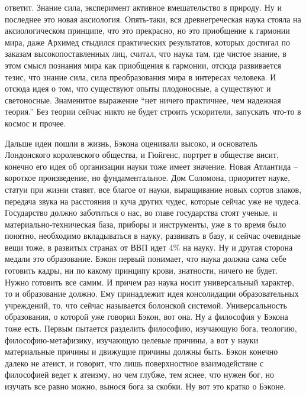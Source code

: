 \documentclass[a4paper, 12pt]{article}
\begin{document}
ответит. Знание сила, эксперимент активное вмешательство в природу. Ну 
и последнее это новая аксиология. Опять-таки, вся древнегреческая наука 
стояла на аксиологическом принципе, что это прекрасно, но это приобщение 
к гармонии мира, даже Архимед стыдился практических результатов, которых 
достигал по заказам высокопоставленных лиц, считал, что наука там, где 
чистое знание, в этом смысл познания мира как приобщения к гармонии, 
отсюда развивается тезис, что знание сила, сила преобразования мира 
в интересах человека. И отсюда идея о том, что существуют опыты 
плодоносные, а существуют и светоносные. Знаменитое выражение ``нет 
ничего практичнее, чем надежная теория.'' Без теории сейчас никто не 
будет строить ускорители, запускать что-то в космос и прочее.

Дальше идеи пошли в жизнь, Бэкона оценивали высоко, и основатель 
Лондонского королевского общества, и Гюйгенс, портрет в обществе висит, 
конечно его идея об организации науки тоже имеет значение. Новая 
Атлантида -- короткое произведение, но фундаментальное. Дом Соломона, 
приоритет науке, статуи при жизни ставят, все благое от науки, 
выращивание новых сортов злаков, передача звука на расстояния и куча 
других чудес, которые сейчас уже не чудеса. Государство должно 
заботиться о нас, во главе государства стоят ученые, 
и материально-техническая база, приборы и инструменты, уже в то время 
было понятно, необходимо вкладываться в науку, развивать в базу, 
и сейчас очевидные вещи тоже, в развитых странах от ВВП идет 4\% на 
науку. Ну и другая сторона медали это образование. Бэкон первый 
понимает, что наука должна сама себе готовить кадры, ни по какому 
принципу крови, знатности, ничего не будет. Нужно готовить все самим. 
И причем раз наука носит универсальный характер, то и образование 
должно. Ему принадлежит идея консолидации образовательных учреждений, 
то, что сейчас называется болонской системой. Универсальность 
образования, о которой уже говорил Бэкон, вот она. Ну а философия 
у Бэкона тоже есть. Первым пытается разделить философию, изучающую бога, 
теологию, философию-метафизику, изучающую целевые причины, а вот у науки 
материальные причины и движущие причины должны быть. Бэкон конечно 
далеко не атеист, и говорит, что лишь поверхностное взаимодействие 
с философией ведет к атеизму, но чем глубже, тем яснее, что нужен бог, 
но изучать все равно можно, вынося бога за скобки. Ну вот это кратко 
о Бэконе.
\end{document}
